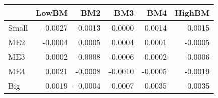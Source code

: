 \begin{tabular}{lrrrrr}
\toprule
{} &   LowBM &     BM2 &     BM3 &     BM4 &  HighBM \\
\midrule
Small & -0.0027 &  0.0013 &  0.0000 &  0.0014 &  0.0015 \\
ME2   & -0.0004 &  0.0005 &  0.0004 &  0.0001 & -0.0005 \\
ME3   &  0.0002 &  0.0008 & -0.0006 & -0.0002 & -0.0006 \\
ME4   &  0.0021 & -0.0008 & -0.0010 & -0.0005 & -0.0019 \\
Big   &  0.0019 & -0.0004 & -0.0007 & -0.0035 & -0.0035 \\
\bottomrule
\end{tabular}
